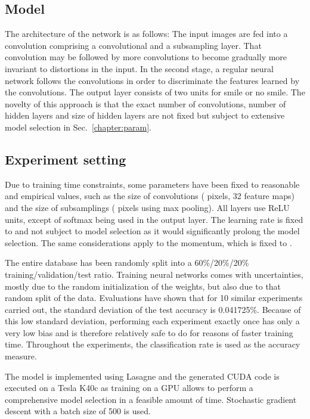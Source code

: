 \documentclass{ws-procs9x6}
\begin{document}
\subsection{Model}
The architecture of the network is as follows:
The input images are fed into a convolution comprising a convolutional and a subsampling layer. That convolution may be followed by more convolutions to become gradually more invariant to distortions in the input. In the second stage, a regular neural network follows the convolutions in order to discriminate the features learned by the convolutions. The output layer consists of two units for smile or no smile.
The novelty of this approach is that the exact number of convolutions, number of hidden layers and size of hidden layers are not fixed but subject to extensive model selection in Sec.~\ref{chapter:param}.

\subsection{Experiment setting}
\label{chapter:setting}
Due to training time constraints, some parameters have been fixed to reasonable and empirical values, such as the size of convolutions ( pixels, 32 feature maps) and the size of subsamplings ( pixels using max pooling). All layers use ReLU units, except of softmax being used in the output layer. The learning rate is fixed to  and not subject to model selection as it would significantly prolong the model selection. The same considerations apply to the momentum, which is fixed to .

The entire database has been randomly split into a 60\%/20\%/20\% training/validation/test ratio. Training neural networks comes with uncertainties, mostly due to the random initialization of the weights, but also due to that random split of the data. Evaluations have shown that for 10 similar experiments carried out, the standard deviation of the test accuracy is 0.041725\%. Because of this low standard deviation, performing each experiment exactly once has only a very low bias and is therefore relatively safe to do for reasons of faster training time.
Throughout the experiments, the classification rate is used as the accuracy measure. 

The model is implemented using Lasagne \cite{lasagne} and the generated CUDA code is executed on a Tesla K40c \cite{tesla} as training on a GPU allows to perform a comprehensive model selection in a feasible amount of time. Stochastic gradient descent with a batch size of 500 is used.
\end{document}
